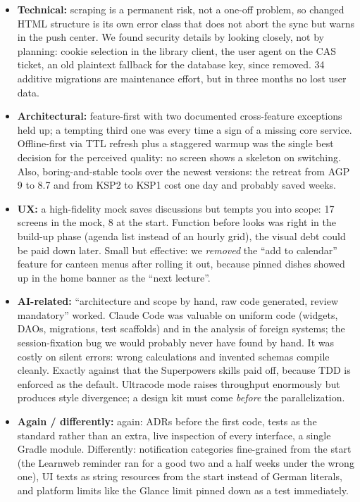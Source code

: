 \documentclass{msereport}
\begin{document}
\begin{itemize}
  \item \textbf{Technical:} scraping is a permanent risk, not a one-off problem,
        so changed HTML structure is its own error class that does not abort the
        sync but warns in the push center. We found security details by looking
        closely, not by planning: cookie selection in the library client, the
        user agent on the CAS ticket, an old plaintext fallback for the
        database key, since removed. 34 additive migrations are maintenance
        effort, but in three months no lost user data.
  \item \textbf{Architectural:} feature-first with two documented
        cross-feature exceptions held up; a tempting third one was every
        time a sign of a missing core service. Offline-first via
        TTL refresh plus a staggered warmup was the single best decision for
        the perceived quality: no screen shows a skeleton on switching.
        Also, boring-and-stable tools over the newest versions: the
        retreat from AGP 9 to 8.7 and from KSP2 to KSP1 cost one day and
        probably saved weeks.
  \item \textbf{UX:} a high-fidelity mock saves discussions but tempts you into
        scope: 17 screens in the mock, 8 at the start. Function before looks was
        right in the build-up phase (agenda list instead of an hourly grid), the
        visual debt could be paid down later. Small but effective: we
        \emph{removed} the ``add to calendar'' feature for canteen menus after
        rolling it out, because pinned dishes showed up in the home banner as the
        ``next lecture''.
  \item \textbf{AI-related:} ``architecture and scope by hand, raw code
        generated, review mandatory'' worked. Claude Code was valuable on
        uniform code (widgets, DAOs, migrations, test scaffolds) and in the
        analysis of foreign systems; the session-fixation bug we would probably
        never have found by hand. It was costly on silent errors: wrong
        calculations and invented schemas compile cleanly. Exactly against that
        the Superpowers skills paid off, because TDD is enforced as the default.
        Ultracode mode raises throughput enormously but produces
        style divergence; a design kit must come \emph{before} the
        parallelization.
  \item \textbf{Again / differently:} again: ADRs before the first code, tests
        as the standard rather than an extra, live inspection of every
        interface, a single Gradle module. Differently: notification categories
        fine-grained from the start (the Learnweb reminder ran for a good two and
        a half weeks under the wrong one), UI texts as string resources from the
        start instead of German literals, and platform limits like the Glance
        limit pinned down as a test immediately.
\end{itemize}
\end{document}
